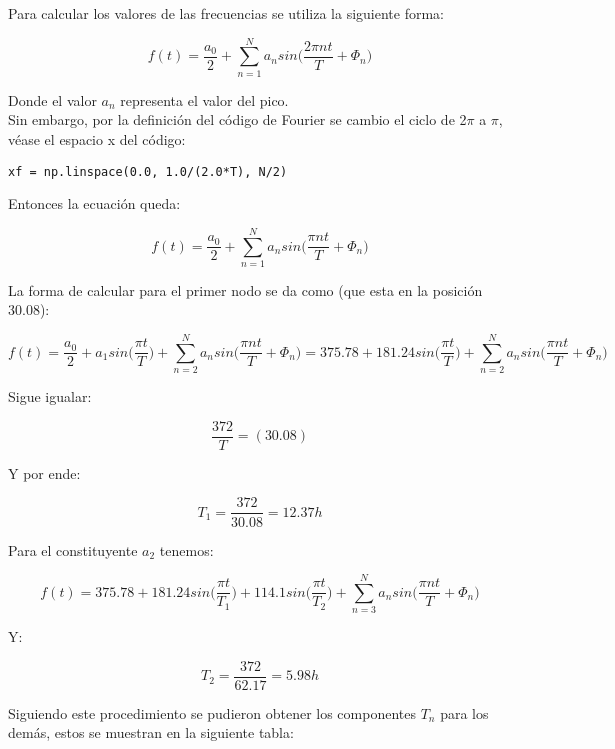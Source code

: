 \documentclass[12pt,letterpaper]{article}
\begin{document}
Para calcular los valores de las frecuencias se utiliza la siguiente forma:

\begin{equation}
f(t) = \frac{a_{0}}{2} + \sum^{N}_{n=1} a_{n}sin\bigg(\frac{2\pi nt}{T} + \Phi_{n}\bigg)
\end{equation}

Donde el valor $a_{n}$ representa el valor del pico.\\
Sin embargo, por la definición del código de Fourier se cambio el ciclo de 2$\pi$ a $\pi$, véase el espacio x del código:

\begin{verbatim}
xf = np.linspace(0.0, 1.0/(2.0*T), N/2)
\end{verbatim}

Entonces la ecuación queda:

\begin{equation}
f(t) = \frac{a_{0}}{2} + \sum^{N}_{n=1} a_{n}sin\bigg(\frac{\pi nt}{T} + \Phi_{n}\bigg)
\end{equation}

La forma de calcular para el primer nodo se da como (que esta en la posición 30.08):

$$ f(t) = \frac{a_{0}}{2} + a_{1}sin\bigg(\frac{\pi t}{T}\bigg) + \sum^{N}_{n=2} a_{n}sin\bigg(\frac{\pi nt}{T} + \Phi_{n}\bigg) = 375.78 + 181.24sin\bigg(\frac{\pi t}{T}\bigg) + \sum^{N}_{n=2} a_{n}sin\bigg(\frac{\pi nt}{T} + \Phi_{n}\bigg)
$$

Sigue igualar:

$$ \frac{372}{T}  = (30.08)$$

Y por ende:

$$ T_{1} = \frac{372}{30.08} =  12.37 h$$

Para el constituyente $a_{2}$ tenemos:

$$ f(t) = 375.78 + 181.24sin\bigg(\frac{\pi t}{T_1}\bigg) + 114.1sin\bigg(\frac{\pi t}{T_2}\bigg) + \sum^{N}_{n=3} a_{n}sin\bigg(\frac{\pi nt}{T} + \Phi_{n}\bigg)
$$

Y:

$$ T_{2} = \frac{372}{62.17} =  5.98 h$$

Siguiendo este procedimiento se pudieron obtener los componentes $T_{n}$ para los demás, estos se muestran en la siguiente tabla:
\end{document}
